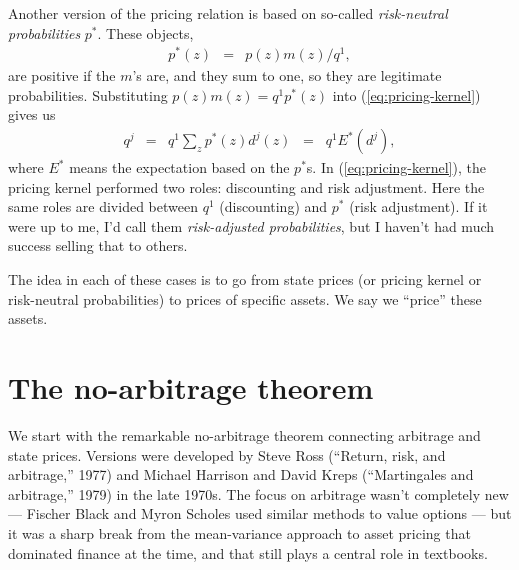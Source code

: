 \documentclass[11pt]{article}
\begin{document}
Another version of the pricing relation is based on so-called {\it risk-neutral probabilities\/} $p^*$.
These objects,
\begin{eqnarray*}
    p^*(z) &=& p(z) m(z) /q^1 ,
\end{eqnarray*}
are positive if the $m$'s are, and they sum to one,
so they are legitimate probabilities.
Substituting $ p(z) m(z) = q^1 p^*(z) $ into (\ref{eq:pricing-kernel}) gives us
\begin{eqnarray}
    q^j   &=& q^1 \sum_z p^*(z) d^j(z)  \;\;=\;\; q^1 E^* (d^j) ,
    \label{eq:risk-neutral-probs}
\end{eqnarray}
where $E^*$ means the expectation based on the $p^*$s.
In (\ref{eq:pricing-kernel}), the pricing kernel performed two roles:
discounting and risk adjustment.
Here the same roles are divided between $q^1$ (discounting)
and $p^*$ (risk adjustment).
If it were up to me, I'd call them {\it risk-adjusted probabilities\/},
but I haven't had much success selling that to others.


The idea in each of these cases is to go from
state prices (or pricing kernel or risk-neutral probabilities)
to prices of specific assets.
We say we ``price'' these assets.


\section{The no-arbitrage theorem}

We start with the remarkable no-arbitrage theorem
connecting arbitrage and state prices.
Versions were developed by
Steve Ross (``Return, risk, and arbitrage,'' 1977)
and Michael Harrison and David Kreps (``Martingales and arbitrage,'' 1979)
in the late 1970s.
The focus on arbitrage wasn't completely new ---
Fischer Black and Myron Scholes used similar methods to value options ---
but it was a sharp break from the mean-variance approach to asset pricing
that dominated finance at the time,
and that still plays a central role in textbooks.
\end{document}
